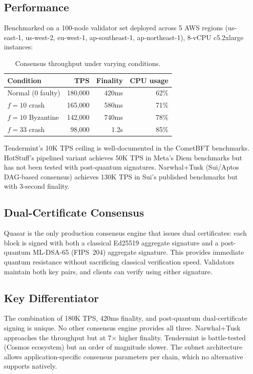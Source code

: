 \documentclass[11pt,twocolumn]{article}
\begin{document}
\subsection{Performance}

Benchmarked on a 100-node validator set deployed across 5 AWS regions (us-east-1, us-west-2, eu-west-1, ap-southeast-1, ap-northeast-1), 8-vCPU c5.2xlarge instances:

\begin{table}[H]
\centering
\caption{Consensus throughput under varying conditions.}
\footnotesize
\begin{tabular}{@{}lrrr@{}}
\toprule
Condition & TPS & Finality & CPU usage \\
\midrule
Normal (0 faulty) & 180,000 & 420ms & 62\% \\
$f = 10$ crash & 165,000 & 580ms & 71\% \\
$f = 10$ Byzantine & 142,000 & 740ms & 78\% \\
$f = 33$ crash & 98,000 & 1.2s & 85\% \\
\bottomrule
\end{tabular}
\end{table}

Tendermint's 10K TPS ceiling is well-documented in the CometBFT benchmarks. HotStuff's pipelined variant achieves 50K TPS in Meta's Diem benchmarks but has not been tested with post-quantum signatures. Narwhal+Tusk (Sui/Aptos DAG-based consensus) achieves 130K TPS in Sui's published benchmarks but with 3-second finality.

\subsection{Dual-Certificate Consensus}

Quasar is the only production consensus engine that issues dual certificates: each block is signed with both a classical Ed25519 aggregate signature and a post-quantum ML-DSA-65 (FIPS~204) aggregate signature. This provides immediate quantum resistance without sacrificing classical verification speed. Validators maintain both key pairs, and clients can verify using either signature.

\subsection{Key Differentiator}

The combination of 180K TPS, 420ms finality, and post-quantum dual-certificate signing is unique. No other consensus engine provides all three. Narwhal+Tusk approaches the throughput but at 7$\times$ higher finality. Tendermint is battle-tested (Cosmos ecosystem) but an order of magnitude slower. The subnet architecture allows application-specific consensus parameters per chain, which no alternative supports natively.
\end{document}

